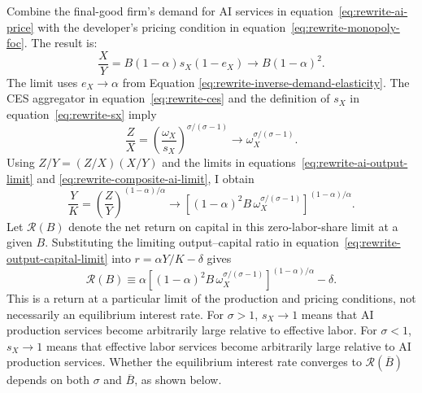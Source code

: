 Combine the final-good firm's demand for AI services in
equation~\eqref{eq:rewrite-ai-price} with the developer's pricing condition in equation~\eqref{eq:rewrite-monopoly-foc}. The result is:
\begin{equation}
 \frac XY=B(1-\alpha)s_X(1-e_X)
 \longrightarrow B(1-\alpha)^2.
 \label{eq:rewrite-ai-output-limit}
\end{equation}
The limit uses $e_X\to\alpha$ from Equation
\eqref{eq:rewrite-inverse-demand-elasticity}. %
The CES aggregator in equation~\eqref{eq:rewrite-ces} and the definition of
$s_X$ in equation~\eqref{eq:rewrite-sx} imply
\begin{equation}
 \frac ZX=\left(\frac{\omega_X}{s_X}\right)^{\sigma/(\sigma-1)}
 \longrightarrow\omega_X^{\sigma/(\sigma-1)}.
 \label{eq:rewrite-composite-ai-limit}
\end{equation}
Using $Z/Y=(Z/X)(X/Y)$ and the limits
in equations~\eqref{eq:rewrite-ai-output-limit} and
\eqref{eq:rewrite-composite-ai-limit}, I obtain
\begin{equation}
 \frac YK=\left(\frac ZY\right)^{(1-\alpha)/\alpha}
 \longrightarrow
 \left[(1-\alpha)^2B\,\omega_X^{\sigma/(\sigma-1)}\right]^{(1-\alpha)/\alpha}.
 \label{eq:rewrite-output-capital-limit}
\end{equation}
Let $\mathcal R(B)$ denote the net return on capital in this zero-labor-share limit at a given $B$. Substituting the limiting output--capital ratio in
equation~\eqref{eq:rewrite-output-capital-limit} into $r=\alpha Y/K-\delta$ gives
\begin{equation}
 \mathcal R(B)
 \equiv\alpha\left[(1-\alpha)^2B\,
 \omega_X^{\sigma/(\sigma-1)}\right]^{(1-\alpha)/\alpha}-\delta.
 \label{eq:rewrite-ai-terminal-ratio}
\end{equation}
This is a return at a particular limit of the production and pricing conditions, not necessarily an equilibrium interest rate. %
For $\sigma>1$, $s_X\to1$ means that AI production services become arbitrarily large relative to effective labor. For $\sigma<1$, $s_X\to1$ means that effective labor services become arbitrarily large relative to AI production services. Whether the equilibrium interest rate converges to $\mathcal R(\overline B)$ depends on both $\sigma$ and $\overline B$, as shown below.

